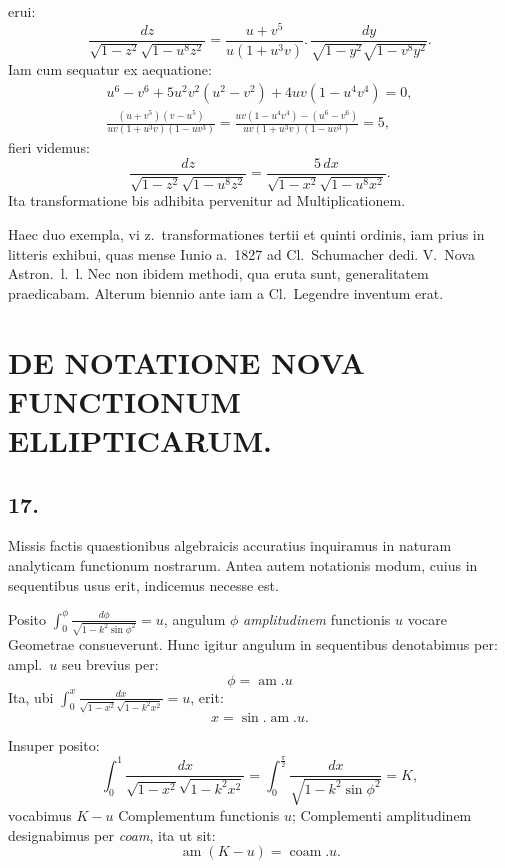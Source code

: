 \documentclass{article}
\begin{document}
erui:
\[
\frac{dz}{\sqrt{1-z^{2}}\sqrt{1-u^{8}z^{2}}}=\frac{u+v^{5}}{u(1+u^{3}v)}.\,\frac{dy}{\sqrt{1-y^{2}}\sqrt{1-v^{8}y^{2}}}.
\]
Iam cum sequatur ex aequatione:
\[
\begin{gathered}
u^{6}-v^{6}+5u^{2}v^{2}(u^{2}-v^{2})+4uv(1-u^{4}v^{4})=0,\\
\frac{(u+v^{5})(v-u^{5})}{uv(1+u^{3}v)(1-uv^{3})}=\frac{uv(1-u^{4}v^{4})-(u^{6}-v^{6})}{uv(1+u^{3}v)(1-uv^{3})}=5,
\end{gathered}
\]
fieri videmus:
\[
\frac{dz}{\sqrt{1-z^{2}}\sqrt{1-u^{8}z^{2}}}=\frac{5\,dx}{\sqrt{1-x^{2}}\sqrt{1-u^{8}x^{2}}}.
\]
Ita transformatione bis adhibita pervenitur ad Multiplicationem.

Haec duo exempla, vi z.\ transformationes tertii et quinti ordinis, iam prius in litteris exhibui, quas mense Iunio a.\ 1827 ad Cl.\ Schumacher dedi. V.\ Nova Astron.\ l.\ l. Nec non ibidem methodi, qua eruta sunt, generalitatem praedicabam. Alterum biennio ante iam a Cl.\ Legendre inventum erat.

\section*{DE NOTATIONE NOVA FUNCTIONUM ELLIPTICARUM.}

\subsection*{17.}

Missis factis quaestionibus algebraicis accuratius inquiramus in naturam analyticam functionum nostrarum. Antea autem notationis modum, cuius in sequentibus usus erit, indicemus necesse est.

Posito $\displaystyle\int_{0}^{\phi}\frac{d\phi}{\sqrt{1-k^{2}\sin\phi^{2}}}=u$, angulum $\phi$ \emph{amplitudinem} functionis $u$ vocare Geometrae consueverunt. Hunc igitur angulum in sequentibus denotabimus per: ampl.\ $u$ seu brevius per:
\[
\phi=\operatorname{am}.u
\]
Ita, ubi $\displaystyle\int_{0}^{x}\frac{dx}{\sqrt{1-x^{2}}\sqrt{1-k^{2}x^{2}}}=u$, erit:
\[
x=\sin.\operatorname{am}.u.
\]

Insuper posito:
\[
\int_{0}^{1}\frac{dx}{\sqrt{1-x^{2}}\sqrt{1-k^{2}x^{2}}}=\int_{0}^{\frac{\pi}{2}}\frac{dx}{\sqrt{1-k^{2}\sin\phi^{2}}}=K,
\]
vocabimus $K-u$ Complementum functionis $u$; Complementi amplitudinem designabimus per \emph{coam}, ita ut sit:
\[
\operatorname{am}(K-u)=\operatorname{coam}.u.
\]
\end{document}
